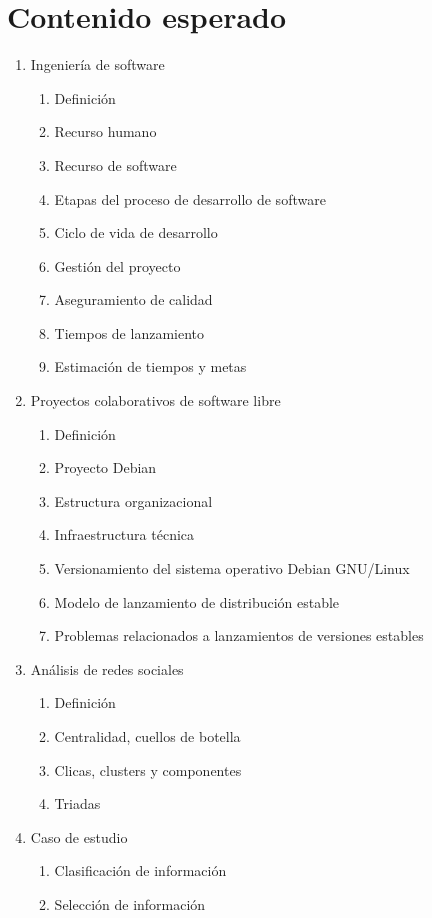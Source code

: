 \documentclass[12pt]{report}
\begin{document}
\chapter*{Contenido esperado}
\begin{enumerate}
\item Ingeniería de software
  \begin{enumerate}
  \item Definición
  \item Recurso humano
  \item Recurso de software
  \item Etapas del proceso de desarrollo de software
  \item Ciclo de vida de desarrollo
  \item Gestión del proyecto
  \item Aseguramiento de calidad
  \item Tiempos de lanzamiento
  \item Estimación de tiempos y metas
  \end{enumerate}
\item Proyectos colaborativos de software libre
  \begin{enumerate}
  \item Definición
  \item Proyecto Debian
  \item Estructura organizacional
  \item Infraestructura técnica
  \item Versionamiento del sistema operativo Debian GNU/Linux
  \item Modelo de lanzamiento de distribución estable
  \item Problemas relacionados a lanzamientos de versiones estables
  \end{enumerate}
\item Análisis de redes sociales
  \begin{enumerate}
  \item Definición
  \item Centralidad, cuellos de botella
  \item Clicas, clusters y componentes
  \item Triadas
  \end{enumerate}
\item Caso de estudio
  \begin{enumerate}
  \item Clasificación de información
  \item Selección de información

\end{enumerate}
\end{enumerate}
\end{document}
